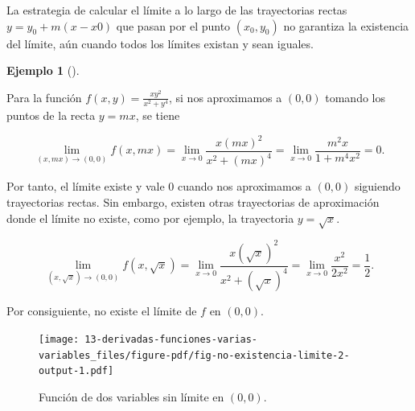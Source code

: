 \documentclass[
  a4paper,
]{scrreport}
\theoremstyle{plain}
\theoremstyle{plain}
\theoremstyle{definition}
\theoremstyle{definition}
\newtheorem{example}{Ejemplo}[chapter]
\theoremstyle{plain}
\theoremstyle{definition}
\theoremstyle{remark}
\begin{document}
\begin{tcolorbox}[enhanced jigsaw, rightrule=.15mm, toptitle=1mm, colbacktitle=quarto-callout-caution-color!10!white, bottomrule=.15mm, opacityback=0, arc=.35mm, breakable, toprule=.15mm, left=2mm, coltitle=black, colback=white, opacitybacktitle=0.6, titlerule=0mm, colframe=quarto-callout-caution-color-frame, bottomtitle=1mm, title=\textcolor{quarto-callout-caution-color}{\faFire}\hspace{0.5em}{Precaución}, leftrule=.75mm]

La estrategia de calcular el límite a lo largo de las trayectorias
rectas \(y=y_0+m(x-x0)\) que pasan por el punto \((x_0,y_0)\) no
garantiza la existencia del límite, aún cuando todos los límites existan
y sean iguales.

\end{tcolorbox}

\begin{example}[]\protect\hypertarget{exm-no-existencia-limite-2}{}\label{exm-no-existencia-limite-2}

Para la función \(f(x,y)=\frac{xy^2}{x^2+y^4}\), si nos aproximamos a
\((0,0)\) tomando los puntos de la recta \(y=mx\), se tiene

\[
\lim_{(x,mx)\to(0,0)} f(x,mx) 
= \lim_{x\to 0} \frac{x(mx)^2}{x^2+(mx)^4}
= \lim_{x\to 0} \frac{m^2x}{1+m^4x^2}
= 0.
\]

Por tanto, el límite existe y vale \(0\) cuando nos aproximamos a
\((0,0)\) siguiendo trayectorias rectas. Sin embargo, existen otras
trayectorias de aproximación donde el límite no existe, como por
ejemplo, la trayectoria \(y = \sqrt{x}\).

\[
\lim_{(x,\sqrt{x})\to(0,0)} f(x,\sqrt{x}) 
= \lim_{x\to 0} \frac{x(\sqrt{x})^2}{x^2+(\sqrt{x})^4}
= \lim_{x\to 0} \frac{x^2}{2x^2}
= \frac{1}{2}.
\]

Por consiguiente, no existe el límite de \(f\) en \((0,0)\).

\begin{figure}

{\centering \texttt{[image: 13-derivadas-funciones-varias-variables\_files/figure-pdf/fig-no-existencia-limite-2-output-1.pdf]}

}

\caption{\label{fig-no-existencia-limite-2}Función de dos variables sin
límite en \((0,0)\).}

\end{figure}

\end{example}
\end{document}
